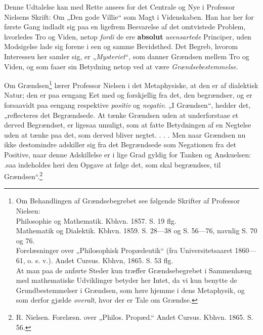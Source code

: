 \documentclass[12pt,a4paper]{book}
\newcommand{\opage}[1]{\marginnote{\footnotesize\textit{[#1]}}}
\begin{document}
Denne Udtalelse kan med Rette ansees for det Centrale
og Nye i Professor Nielsens Skrift: Om „Den
gode Villie“ som Magt i Videnskaben. Han har her
for første Gang indladt sig paa en ligefrem Besvarelse
af det omtvistede Problem, hvorledes Tro og Viden,
netop \emph{fordi} de ere \textbf{absolut} \emph{ueensartede} Principer,
uden Modsigelse lade sig forene i een og samme Bevidsthed.
Det Begreb, hvorom Interesseu her samler
sig, er „\emph{Mysteriet}“, som danner Grændsen mellem Tro
\opage{13}\setcounter{footnote}{0}%
og Viden, og som faaer sin Betydning netop ved at
være \emph{Grændsebestemmelse}.

Om Grændsen\footnote{Om Behandlingen af Grændsebegrebet see følgende Skrifter af Professor Nielsen:\\
Philosophie og Mathematik. Kbhvn. 1857. S. 19 flg.\\
Mathematik og Dialektik. Kbhvn. 1859. S. 28---38 og S. 56---76, navnlig S. 70 og 76.\\
Forelæsninger over „Philosophisk Propædeutik“ (fra Universitetsaaret 1860---61, o. s. v.). Andet Cursus. Kbhvn, 1865. S. 53 flg.\\
At man paa de anførte Steder kun træffer Grændsebegrebet i Sammenhæng med mathematiske Udviklinger betyder her Intet, da vi kun benytte de Grundbestemmelser i Grændsen, som høre hjemme i dens Metaphysik, og som derfor gjælde \emph{overalt}, hvor der er Tale om Grændse.} lærer Professor Nielsen i det Metaphysiske,
at den er af dialektisk Natur; den er paa
eengang Eet med og forskjellig fra det, den begrændser,
og er forsaavidt paa eengang respektive \emph{positiv} og \emph{negativ}.
„I Grændsen“, hedder det, „reflecteres det Begrændsede.
At tænke Grændsen uden at underforstaae et
derved Begrændset, er ligesaa umuligt, som at fatte Betydningen
af en Negtelse uden at tænke paa det, som derved
bliver negtet. . . . Men naar Grændsen nu ikke destomindre
adskiller sig fra det Begrændsede som Negationen fra
det Positive, naar denne Adskillelse er i lige Grad gyldig
for Tanken og Anskuelsen: .saa indeholdes heri den Opgave
at følge det, som skal begrændses, til Grændsen“.\footnote{R. Nielsen. Forelæsn. over „Philos. Propæd.“ Andet Cursus. Kbhvn. 1865. S. 56.}
\end{document}
